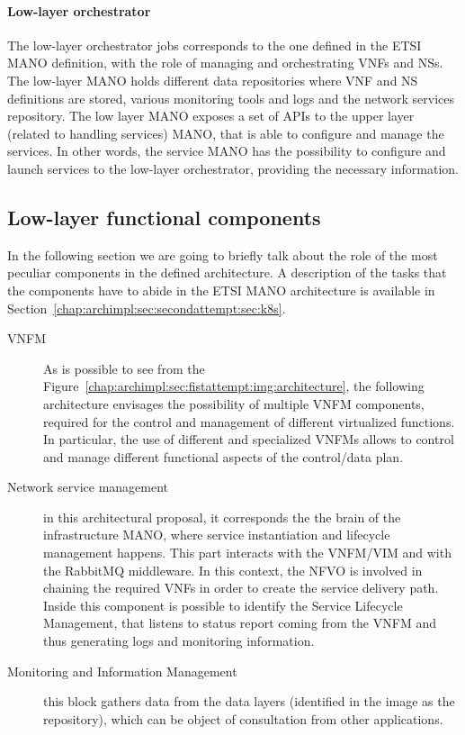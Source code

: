 \paragraph*{Low-layer orchestrator}
The low-layer orchestrator jobs corresponds to the one defined in the ETSI MANO
definition, with the role of managing and orchestrating VNFs and NSs. The
low-layer MANO holds different data repositories where VNF and NS definitions
are stored, various monitoring tools and logs and the network services
repository. The low layer MANO exposes a set of APIs to the upper layer (related
to handling services) MANO, that is able to configure and manage the services.
In other words, the service MANO has the possibility to configure and launch
services to the low-layer orchestrator, providing the necessary information.

\subsection{Low-layer functional components}
In the following section we are going to briefly talk about the role of the most
peculiar components in the defined architecture. A description of the tasks that
the components have to abide in the ETSI MANO architecture is available in
Section~\ref{chap:archimpl:sec:secondattempt:sec:k8s}.
\begin{description}
\item[VNFM] As is possible to see from the
  Figure~\ref{chap:archimpl:sec:fistattempt:img:architecture}, the following
  architecture envisages the possibility of multiple VNFM components, required
  for the control and management of different virtualized functions. In
  particular, the use of different and specialized VNFMs allows to control and
  manage different functional aspects of the control/data plan.
\item[Network service management] in this architectural proposal, it corresponds
  the the brain of the infrastructure MANO, where service instantiation and
  lifecycle management happens. This part interacts with the VNFM/VIM and with
  the RabbitMQ middleware. In this context, the NFVO is involved in chaining the
  required VNFs in order to create the service delivery path. Inside this
  component is possible to identify the Service Lifecycle Management, that
  listens to status report coming from the VNFM and thus generating logs and
  monitoring information.
\item[Monitoring and Information Management] this block gathers data from the
  data layers (identified in the image as the repository), which can be object
  of consultation from other applications.
\end{description}

